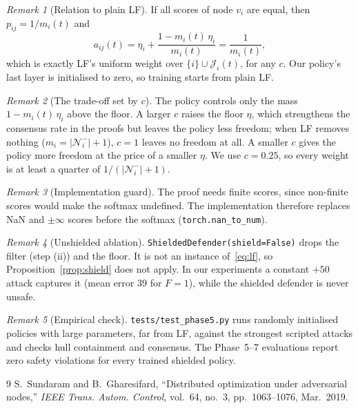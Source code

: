 \documentclass[11pt]{article}
\theoremstyle{definition}
\theoremstyle{remark}
\newtheorem*{remark}{Remark}
\newcommand{\Nin}{\mathcal{N}_i^{-}}
\newcommand{\J}{\mathcal{J}_i(t)}
\newcommand{\code}[1]{\texttt{#1}}
\begin{document}
\begin{remark}[Relation to plain LF]
If all scores of node $v_i$ are equal, then $p_{ij} = 1/m_i(t)$ and
\[
  a_{ij}(t) = \eta_i + \frac{1 - m_i(t)\,\eta_i}{m_i(t)} = \frac{1}{m_i(t)},
\]
which is exactly LF's uniform weight over $\{i\}\cup\J$, for any $c$. Our policy's last layer is initialised to zero, so training starts from plain LF.
\end{remark}

\begin{remark}[The trade-off set by $c$]
The policy controls only the mass $1 - m_i(t)\,\eta_i$ above the floor. A larger $c$ raises the floor $\eta$, which strengthens the consensus rate in the proofs but leaves the policy less freedom; when LF removes nothing ($m_i = |\Nin|+1$), $c = 1$ leaves no freedom at all. A smaller $c$ gives the policy more freedom at the price of a smaller $\eta$. We use $c = 0.25$, so every weight is at least a quarter of $1/(|\Nin|+1)$.
\end{remark}

\begin{remark}[Implementation guard]
The proof needs finite scores, since non-finite scores would make the softmax undefined. The implementation therefore replaces NaN and $\pm\infty$ scores before the softmax (\code{torch.nan\_to\_num}).
\end{remark}

\begin{remark}[Unshielded ablation]
\code{ShieldedDefender(shield=False)} drops the filter (step (ii)) and the floor. It is not an instance of~\eqref{eq:lf}, so Proposition~\ref{prop:shield} does not apply. In our experiments a constant $+50$ attack captures it (mean error $39$ for $F=1$), while the shielded defender is never unsafe.
\end{remark}

\begin{remark}[Empirical check]
\code{tests/test\_phase5.py} runs randomly initialised policies with large parameters, far from LF, against the strongest scripted attacks and checks hull containment and consensus. The Phase~5--7 evaluations report zero safety violations for every trained shielded policy.
\end{remark}

\begin{thebibliography}{9}
S.~Sundaram and B.~Gharesifard, ``Distributed optimization under adversarial nodes,'' \emph{IEEE Trans. Autom. Control}, vol.~64, no.~3, pp.~1063--1076, Mar.~2019.
\end{thebibliography}
\end{document}
